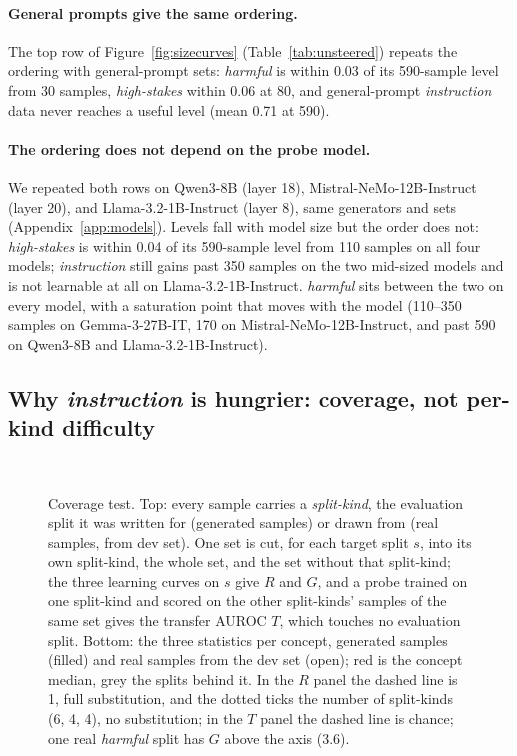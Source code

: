 \documentclass{article} %
\newcommand{\hs}{\emph{high-stakes}}
\newcommand{\harm}{\emph{harmful}}
\newcommand{\instr}{\emph{instruction}}
\begin{document}
\paragraph{General prompts give the same ordering.}
The top row of Figure~\ref{fig:sizecurves} (Table~\ref{tab:unsteered}) repeats the ordering with general-prompt sets: \harm{} is within 0.03 of its 590-sample level from 30 samples, \hs{} within 0.06 at 80, and general-prompt \instr{} data never reaches a useful level (mean 0.71 at 590).

\paragraph{The ordering does not depend on the probe model.}
\label{sec:models}
We repeated both rows on Qwen3-8B (layer 18), Mistral-NeMo-12B-Instruct (layer 20), and Llama-3.2-1B-Instruct (layer 8), same generators and sets (Appendix~\ref{app:models}). Levels fall with model size but the order does not: \hs{} is within 0.04 of its 590-sample level from 110 samples on all four models; \instr{} still gains past 350 samples on the two mid-sized models and is not learnable at all on Llama-3.2-1B-Instruct. \harm{} sits between the two on every model, with a saturation point that moves with the model (110--350 samples on Gemma-3-27B-IT, 170 on Mistral-NeMo-12B-Instruct, and past 590 on Qwen3-8B and Llama-3.2-1B-Instruct).

\subsection{Why \instr{} is hungrier: coverage, not per-kind difficulty}
\label{sec:coverage}

\begin{figure}[t]
  \centering
  \\[4pt]
  
  \caption{Coverage test. Top: every sample carries a \emph{split-kind}, the evaluation split it was written for (generated samples) or drawn from (real samples, from dev set). One set is cut, for each target split $s$, into its own split-kind, the whole set, and the set without that split-kind; the three learning curves on $s$ give $R$ and $G$, and a probe trained on one split-kind and scored on the other split-kinds' samples of the same set gives the transfer AUROC $T$, which touches no evaluation split. Bottom: the three statistics per concept, generated samples (filled) and real samples from the dev set (open); red is the concept median, grey the splits behind it. In the $R$ panel the dashed line is 1, full substitution, and the dotted ticks the number of split-kinds (6, 4, 4), no substitution; in the $T$ panel the dashed line is chance; one real \harm{} split has $G$ above the axis (3.6).}
  \label{fig:dc_schematic}
\end{figure}
\end{document}
